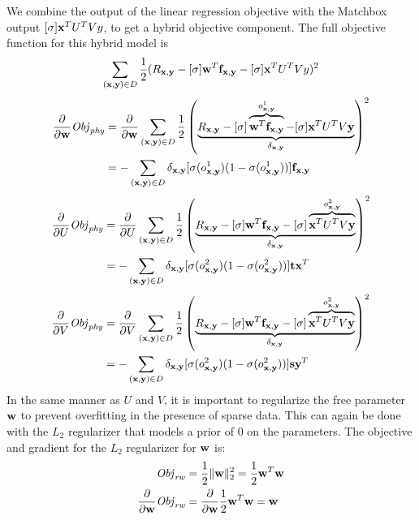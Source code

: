 We combine the output of the linear regression objective with the
Matchbox output $[\sigma] \mathbf{x}^T U^T V y$, to get a hybrid objective
component. The full objective function for this hybrid model is
\begin{align}
\sum_{(\mathbf{x},\mathbf{y}) \in D} \frac{1}{2} (R_{\mathbf{x},\mathbf{y}} - [\sigma] \mathbf{w}^T \mathbf{f}_{\mathbf{x},\mathbf{y}} - [\sigma] \mathbf{x}^T U^T V y)^2
\end{align}
\begin{align*}
\frac{\partial}{\partial \mathbf{w}} \mathit{Obj}_{\mathit{phy}} & = \frac{\partial}{\partial \mathbf{w}} \sum_{(\mathbf{x},\mathbf{y}) \in D} \frac{1}{2} \left( \underbrace{R_{\mathbf{x},\mathbf{y}} - [\sigma] \overbrace{\mathbf{w}^T \mathbf{f}_{\mathbf{x},\mathbf{y}}}^{o^1_{\mathbf{x},\mathbf{y}}} - [\sigma] \mathbf{x}^T U^T V\mathbf{y}}_{\delta_{\mathbf{x},\mathbf{y}}} \right)^2 \\
& = - \sum_{(\mathbf{x},\mathbf{y}) \in D} \delta_{\mathbf{x},\mathbf{y}} [\sigma(o^1_{\mathbf{x},\mathbf{y}}) (1 - \sigma(o^1_{\mathbf{x},\mathbf{y}}))] \mathbf{f}_{\mathbf{x},\mathbf{y}} 
\end{align*}
\begin{align*}
\frac{\partial}{\partial U} \mathit{Obj}_{\mathit{phy}} & = \frac{\partial}{\partial U} \sum_{(\mathbf{x},\mathbf{y}) \in D} \frac{1}{2} \left( \underbrace{R_{\mathbf{x},\mathbf{y}} - [\sigma] \mathbf{w}^T \mathbf{f}_{\mathbf{x},\mathbf{y}} - [\sigma] \overbrace{\mathbf{x}^T U^T V\mathbf{y}}^{o^2_{\mathbf{x},\mathbf{y}}}}_{\delta_{\mathbf{x},\mathbf{y}}}\right)^2 \\
& = - \sum_{(\mathbf{x},\mathbf{y}) \in D} \delta_{\mathbf{x},\mathbf{y}} [\sigma(o^2_{\mathbf{x},\mathbf{y}}) (1 - \sigma(o^2_{\mathbf{x},\mathbf{y}}))] \mathbf{t} \mathbf{x}^T
\end{align*}
\begin{align*}
\frac{\partial}{\partial V} \mathit{Obj}_{\mathit{phy}} & = \frac{\partial}{\partial V} \sum_{(\mathbf{x},\mathbf{y}) \in D} \frac{1}{2} \left( \underbrace{R_{\mathbf{x},\mathbf{y}} - [\sigma] \mathbf{w}^T \mathbf{f}_{\mathbf{x},\mathbf{y}} - [\sigma] \overbrace{\mathbf{x}^T U^T V\mathbf{y}}^{o^2_{\mathbf{x},\mathbf{y}}}}_{\delta_{\mathbf{x},\mathbf{y}}}\right)^2 \\
& = - \sum_{(\mathbf{x},\mathbf{y}) \in D}  \delta_{\mathbf{x},\mathbf{y}} [\sigma(o^2_{\mathbf{x},\mathbf{y}}) (1 - \sigma(o^2_{\mathbf{x},\mathbf{y}}))] \mathbf{s} \mathbf{y}^T \\
\end{align*}
In the same manner as $U$ and $V$, it is important to regularize the
free parameter $\mathbf{w}$ to prevent overfitting in the presence of sparse
data. This can again be done with the $L_2$ regularizer that models a
prior of $0$ on the parameters. The objective and gradient for the
$L_2$ regularizer for $\mathbf{w}$ is:
\begin{align}
 \mathit{Obj}_{\mathit{rw}} & = \frac{1}{2} \| \mathbf{w} \|_2^2 = \frac{1}{2} \mathbf{w}^T \mathbf{w}\\
\frac{\partial}{\partial \mathbf{w}} \mathit{Obj}_{\mathit{rw}} & = \frac{\partial}{\partial \mathbf{w}} \frac{1}{2} \mathbf{w}^T \mathbf{w} = \mathbf{w} \nonumber
\end{align}

